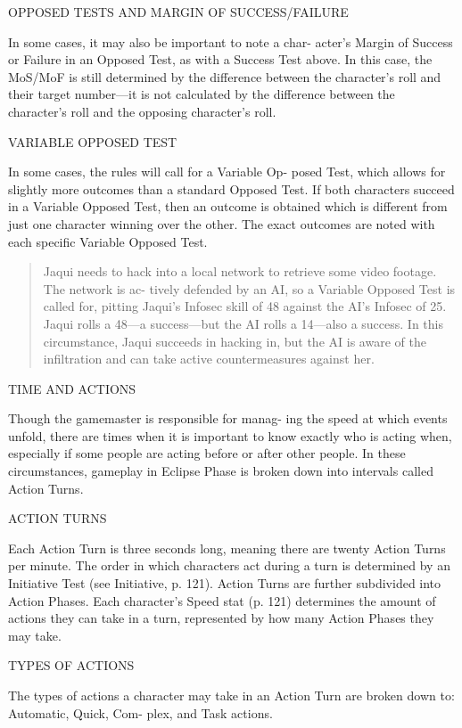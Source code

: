 OPPOSED TESTS AND MARGIN OF SUCCESS/FAILURE

In some cases, it may also be important to note a char-
acter's Margin of Success or Failure in an Opposed
Test, as with a Success Test above. In this case, the
MoS/MoF is still determined by the difference between
the character's roll and their target number—it is not
calculated by the difference between the character's
roll and the opposing character's roll.

VARIABLE OPPOSED TEST

In some cases, the rules will call for a Variable Op-
posed Test, which allows for slightly more outcomes
than a standard Opposed Test. If both characters
succeed in a Variable Opposed Test, then an outcome
is obtained which is different from just one character
winning over the other. The exact outcomes are noted
with each specific Variable Opposed Test.

\begin{quotation}
  Jaqui needs to hack into a local network to retrieve some video
  footage. The network is ac- tively defended by an AI, so a Variable
  Opposed Test is called for, pitting Jaqui's Infosec skill of 48
  against the AI's Infosec of 25. Jaqui rolls a 48—a success—but the
  AI rolls a 14—also a success. In this circumstance, Jaqui succeeds
  in hacking in, but the AI is aware of the infiltration and can take
  active countermeasures against her.
\end{quotation}

TIME AND ACTIONS

Though the gamemaster is responsible for manag-
ing the speed at which events unfold, there are times
when it is important to know exactly who is acting
when, especially if some people are acting before or
after other people. In these circumstances, gameplay
in Eclipse Phase is broken down into intervals called
Action Turns.

ACTION TURNS

Each Action Turn is three seconds long, meaning
there are twenty Action Turns per minute. The order
in which characters act during a turn is determined
by an Initiative Test (see Initiative, p. 121). Action
Turns are further subdivided into Action Phases. Each
character's Speed stat (p. 121) determines the amount
of actions they can take in a turn, represented by how
many Action Phases they may take.

TYPES OF ACTIONS

The types of actions a character may take in an Action
Turn are broken down to: Automatic, Quick, Com-
plex, and Task actions.

